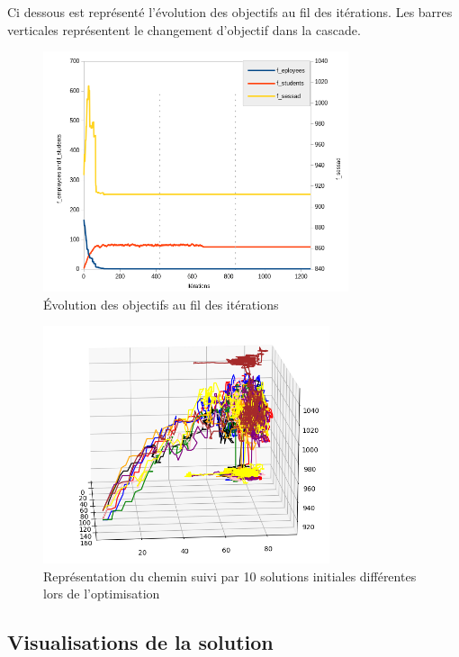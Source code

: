 \documentclass[11pt]{article}
\begin{document}
Ci dessous est représenté l'évolution des objectifs au fil des itérations. Les barres verticales représentent le changement d'objectif dans la cascade.

\begin{figure}[H]
    \centering
    \includegraphics[width=0.8\textwidth]{Images/score_evolution_graph.png}
    \caption{Évolution des objectifs au fil des itérations}
    \label{fig:score_evolution}
\end{figure}

\begin{figure}[H]
    \centering
    \includegraphics[width=0.75\textwidth]{Images/3d_visualisation.png}
    \caption{Représentation du chemin suivi par 10 solutions initiales différentes lors de l'optimisation}
    \label{fig:score_3d}
\end{figure}

\subsection{Visualisations de la solution}
\end{document}
